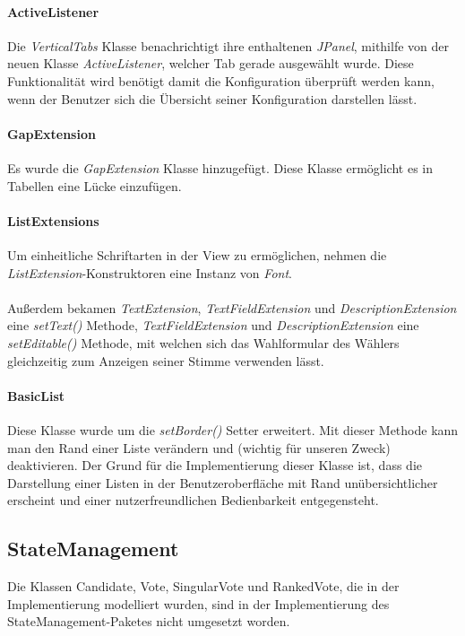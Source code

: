 \documentclass[parskip=full]{scrartcl}
\begin{document}
\paragraph{ActiveListener}
Die \textit{VerticalTabs} Klasse benachrichtigt ihre enthaltenen \textit{JPanel}, mithilfe von der neuen Klasse \textit{ActiveListener}, welcher Tab gerade ausgewählt wurde. Diese Funktionalität wird benötigt damit die Konfiguration überprüft werden kann, wenn der Benutzer sich die Übersicht seiner Konfiguration darstellen lässt. 

\paragraph{GapExtension}
Es wurde die \textit{GapExtension} Klasse hinzugefügt. Diese Klasse ermöglicht es in Tabellen eine Lücke einzufügen.

\paragraph{ListExtensions}
Um einheitliche Schriftarten in der View zu ermöglichen, nehmen die \textit{ListExtension}-Konstruktoren eine Instanz von \textit{Font}.
\\
\\
Außerdem bekamen \textit{TextExtension}, \textit{TextFieldExtension} und \textit{DescriptionExtension} eine \textit{setText()} Methode, \textit{TextFieldExtension} und \textit{DescriptionExtension} eine \textit{setEditable()} Methode, mit welchen sich das Wahlformular des Wählers gleichzeitig zum Anzeigen seiner Stimme verwenden lässt.

\paragraph{BasicList}
Diese Klasse wurde um die \textit{setBorder()} Setter erweitert. Mit dieser Methode kann man den Rand einer Liste verändern und (wichtig für unseren Zweck) deaktivieren. Der Grund für die Implementierung dieser Klasse ist, dass die Darstellung einer Listen in der Benutzeroberfläche mit Rand unübersichtlicher erscheint und einer nutzerfreundlichen Bedienbarkeit entgegensteht.

\subsection{StateManagement}
Die Klassen Candidate, Vote, SingularVote und RankedVote, die in der Implementierung modelliert wurden, sind in der Implementierung des StateManagement-Paketes nicht umgesetzt worden.
\end{document}
